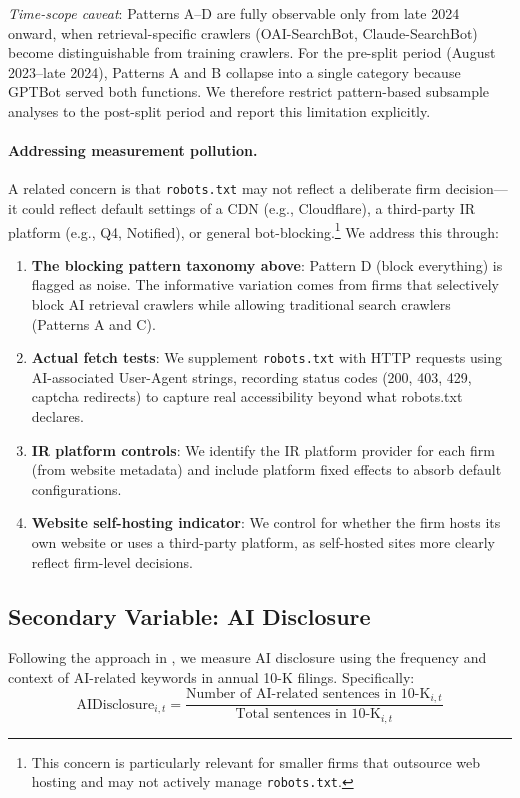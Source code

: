 \documentclass[12pt,a4paper]{article}
\begin{document}
\textit{Time-scope caveat}: Patterns A--D are fully observable only from late 2024 onward, when retrieval-specific crawlers (OAI-SearchBot, Claude-SearchBot) become distinguishable from training crawlers. For the pre-split period (August 2023--late 2024), Patterns A and B collapse into a single category because GPTBot served both functions. We therefore restrict pattern-based subsample analyses to the post-split period and report this limitation explicitly.

\paragraph{Addressing measurement pollution.} A related concern is that \texttt{robots.txt} may not reflect a deliberate firm decision---it could reflect default settings of a CDN (e.g., Cloudflare), a third-party IR platform (e.g., Q4, Notified), or general bot-blocking.\footnote{This concern is particularly relevant for smaller firms that outsource web hosting and may not actively manage \texttt{robots.txt}.} We address this through:
\begin{enumerate}
    \item \textbf{The blocking pattern taxonomy above}: Pattern D (block everything) is flagged as noise. The informative variation comes from firms that selectively block AI retrieval crawlers while allowing traditional search crawlers (Patterns A and C).
    \item \textbf{Actual fetch tests}: We supplement \texttt{robots.txt} with HTTP requests using AI-associated User-Agent strings, recording status codes (200, 403, 429, captcha redirects) to capture real accessibility beyond what robots.txt declares.
    \item \textbf{IR platform controls}: We identify the IR platform provider for each firm (from website metadata) and include platform fixed effects to absorb default configurations.
    \item \textbf{Website self-hosting indicator}: We control for whether the firm hosts its own website or uses a third-party platform, as self-hosted sites more clearly reflect firm-level decisions.
\end{enumerate}

\subsection{Secondary Variable: AI Disclosure}

Following the approach in \citet{CaoLiuQiuZhao2024}, we measure AI disclosure using the frequency and context of AI-related keywords in annual 10-K filings. Specifically:
\begin{equation}
\text{AIDisclosure}_{i,t} = \frac{\text{Number of AI-related sentences in 10-K}_{i,t}}{\text{Total sentences in 10-K}_{i,t}}
\end{equation}
\end{document}
